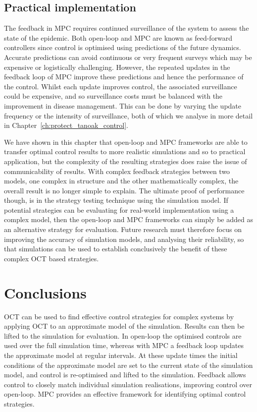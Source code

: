 \subsection{Practical implementation}

The feedback in MPC requires continued surveillance of the system to assess the state of the epidemic. Both open-loop and MPC are known as feed-forward controllers since control is optimised using predictions of the future dynamics. Accurate predictions can avoid continuous or very frequent surveys which may be expensive or logistically challenging. However, the repeated updates in the feedback loop of MPC improve these predictions and hence the performance of the control. Whilst each update improves control, the associated surveillance could be expensive, and so surveillance costs must be balanced with the improvement in disease management. This can be done by varying the update frequency or the intensity of surveillance, both of which we analyse in more detail in Chapter~\ref{ch:protect_tanoak_control}.

We have shown in this chapter that open-loop and MPC frameworks are able to transfer optimal control results to more realistic simulations and so to practical application, but the complexity of the resulting strategies does raise the issue of communicability of results. With complex feedback strategies between two models, one complex in structure and the other mathematically complex, the overall result is no longer simple to explain. The ultimate proof of performance though, is in the strategy testing technique using the simulation model. If potential strategies can be evaluating for real-world implementation using a complex model, then the open-loop and MPC frameworks can simply be added as an alternative strategy for evaluation. Future research must therefore focus on improving the accuracy of simulation models, and analysing their reliability, so that simulations can be used to establish conclusively the benefit of these complex OCT based strategies.

\section{Conclusions}

OCT can be used to find effective control strategies for complex systems by applying OCT to an approximate model of the simulation. Results can then be lifted to the simulation for evaluation. In open-loop the optimised controls are used over the full simulation time, whereas with MPC a feedback loop updates the approximate model at regular intervals. At these update times the initial conditions of the approximate model are set to the current state of the simulation model, and control is re-optimised and lifted to the simulation. Feedback allows control to closely match individual simulation realisations, improving control over open-loop. MPC provides an effective framework for identifying optimal control strategies.
